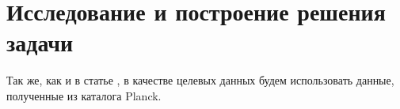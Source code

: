 \chapter{Исследование и построение решения задачи}
\label{cha:ch_3}
Так же, как и в статье \cite{Bonjean}, в качестве целевых данных будем использовать данные, 
полученные из каталога Planck. 
